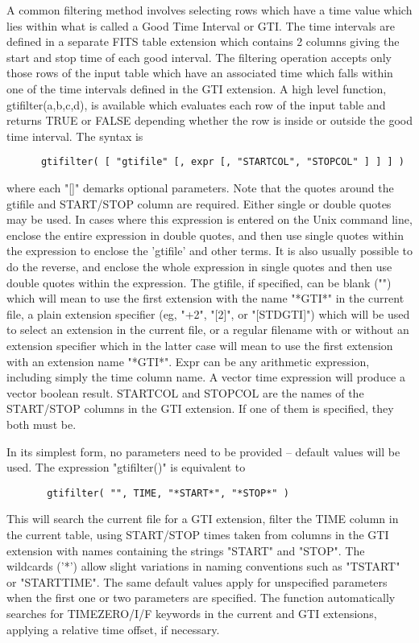 \documentclass[11pt]{book}
\begin{document}
    A common filtering method involves selecting rows which have a time
    value which lies within what is called a Good Time Interval or GTI.
    The time intervals are defined in a separate FITS table extension
    which contains 2 columns giving the start and stop time of each
    good interval.  The filtering operation accepts only those rows of
    the input table which have an associated time which falls within
    one of the time intervals defined in the GTI extension. A high
    level function, gtifilter(a,b,c,d), is available which evaluates
    each row of the input table  and returns TRUE  or FALSE depending
    whether the row is inside or outside the  good time interval.  The
    syntax is

\begin{verbatim}
      gtifilter( [ "gtifile" [, expr [, "STARTCOL", "STOPCOL" ] ] ] )
\end{verbatim}
    where  each "[]" demarks optional parameters.  Note that  the quotes
    around the gtifile and START/STOP column are required.  Either single
    or double quotes may be used.  In cases where this expression is
    entered on the Unix command line, enclose the entire expression in
    double quotes, and then use single quotes within the expression to
    enclose the 'gtifile' and other terms.  It is also usually possible
    to do the reverse, and enclose the whole expression in single quotes
    and then use double quotes within the expression.  The gtifile,
    if specified,  can be blank  ("") which will  mean to use  the first
    extension  with   the name "*GTI*"  in   the current  file,  a plain
    extension  specifier (eg, "+2",  "[2]", or "[STDGTI]") which will be
    used  to  select  an extension  in  the current  file, or  a regular
    filename with or without an extension  specifier which in the latter
    case  will mean to  use the first  extension  with an extension name
    "*GTI*".  Expr can be   any arithmetic expression, including  simply
    the time  column  name.  A  vector  time expression  will  produce a
    vector boolean  result.  STARTCOL and  STOPCOL are the  names of the
    START/STOP   columns in the    GTI extension.  If   one  of them  is
    specified, they both  must be.

    In  its  simplest form, no parameters need to be provided -- default
    values will be used.  The expression "gtifilter()" is equivalent to

\begin{verbatim}
       gtifilter( "", TIME, "*START*", "*STOP*" )
\end{verbatim}
    This will search the current file for a GTI  extension,  filter  the
    TIME  column in the current table, using START/STOP times taken from
    columns in the GTI  extension  with  names  containing  the  strings
    "START"  and "STOP".  The wildcards ('*') allow slight variations in
    naming conventions  such  as  "TSTART"  or  "STARTTIME".   The  same
    default  values  apply for unspecified parameters when the first one
    or  two  parameters  are  specified.   The  function   automatically
    searches   for   TIMEZERO/I/F   keywords  in  the  current  and  GTI
    extensions, applying a relative time offset, if necessary.
\end{document}

